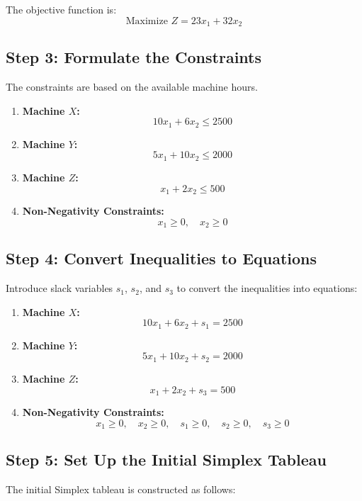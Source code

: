 \documentclass{article}
\begin{document}
The objective function is:
\[
\text{Maximize } Z = 23x_1 + 32x_2
\]

\subsection*{Step 3: Formulate the Constraints}
The constraints are based on the available machine hours.

\begin{enumerate}
    \item \textbf{Machine \( X \):}
    \[
    10x_1 + 6x_2 \leq 2500
    \]
    
    \item \textbf{Machine \( Y \):}
    \[
    5x_1 + 10x_2 \leq 2000
    \]
    
    \item \textbf{Machine \( Z \):}
    \[
    x_1 + 2x_2 \leq 500
    \]
    
    \item \textbf{Non-Negativity Constraints:}
    \[
    x_1 \geq 0, \quad x_2 \geq 0
    \]
\end{enumerate}

\subsection*{Step 4: Convert Inequalities to Equations}
Introduce slack variables \( s_1 \), \( s_2 \), and \( s_3 \) to convert the inequalities into equations:

\begin{enumerate}
    \item \textbf{Machine \( X \):}
    \[
    10x_1 + 6x_2 + s_1 = 2500
    \]
    
    \item \textbf{Machine \( Y \):}
    \[
    5x_1 + 10x_2 + s_2 = 2000
    \]
    
    \item \textbf{Machine \( Z \):}
    \[
    x_1 + 2x_2 + s_3 = 500
    \]
    
    \item \textbf{Non-Negativity Constraints:}
    \[
    x_1 \geq 0, \quad x_2 \geq 0, \quad s_1 \geq 0, \quad s_2 \geq 0, \quad s_3 \geq 0
    \]
\end{enumerate}

\subsection*{Step 5: Set Up the Initial Simplex Tableau}
The initial Simplex tableau is constructed as follows:
\end{document}
